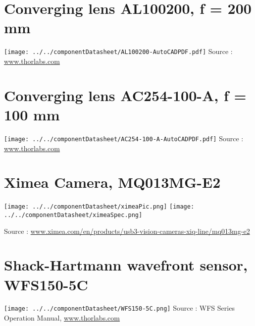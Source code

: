\section{Converging lens AL100200, f = 200 mm}
\label{app:CL200}
\texttt{[image: ../../componentDatasheet/AL100200-AutoCADPDF.pdf]}
Source : \url{www.thorlabs.com}

\section{Converging lens AC254-100-A, f = 100 mm}
\label{app:CL100}
\texttt{[image: ../../componentDatasheet/AC254-100-A-AutoCADPDF.pdf]}
Source : \url{www.thorlabs.com}

\section{Ximea Camera, MQ013MG-E2}
\label{app:ximeaCam}
\begin{center}
\texttt{[image: ../../componentDatasheet/ximeaPic.png]}
\texttt{[image: ../../componentDatasheet/ximeaSpec.png]}
\end{center}
Source : \url{www.ximea.com/en/products/usb3-vision-cameras-xiq-line/mq013mg-e2}

\section{Shack-Hartmann wavefront sensor, WFS150-5C}
\label{app:SHwfs}
\texttt{[image: ../../componentDatasheet/WFS150-5C.png]}
Source : WFS Series Operation Manual, \url{www.thorlabs.com}
